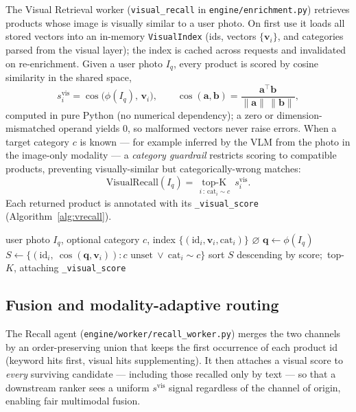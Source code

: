 The Visual Retrieval worker (\texttt{visual\_recall} in
\texttt{engine/enrichment.py}) retrieves products whose image is visually similar
to a user photo. On first use it loads all stored vectors into an in-memory
\texttt{VisualIndex} (ids, vectors $\{\mathbf{v}_i\}$, and categories parsed from
the visual layer); the index is cached across requests and invalidated on
re-enrichment. Given a user photo $I_q$, every product is scored by cosine
similarity in the shared space,
\begin{equation}
  s^{\mathrm{vis}}_i=\cos\!\big(\phi(I_q),\,\mathbf{v}_i\big),
  \qquad
  \cos(\mathbf{a},\mathbf{b})=\frac{\mathbf{a}^{\top}\mathbf{b}}{\lVert\mathbf{a}\rVert\,\lVert\mathbf{b}\rVert},
  \label{eq:svis}
\end{equation}
computed in pure Python (no numerical dependency); a zero or dimension-mismatched
operand yields $0$, so malformed vectors never raise errors. When a target
category $c$ is known --- for example inferred by the VLM from the photo in the
image-only modality --- a \emph{category guardrail} restricts scoring to
compatible products, preventing visually-similar but categorically-wrong matches:
\begin{equation}
  \mathrm{VisualRecall}(I_q)=\operatorname*{top\text{-}K}_{\,i\,:\,\mathrm{cat}_i\sim c}\ s^{\mathrm{vis}}_i .
  \label{eq:vrecall}
\end{equation}
Each returned product is annotated with its \texttt{\_visual\_score}
(Algorithm~\ref{alg:vrecall}).

\begin{algorithm}[t]
\caption{Online visual recall}
\label{alg:vrecall}
\begin{algorithmic}[1]
\Require user photo $I_q$, optional category $c$, index $\{(\text{id}_i,\mathbf{v}_i,\mathrm{cat}_i)\}$
 \Return $\varnothing$ \EndIf
\State $\mathbf{q}\gets\phi(I_q)$
\State $S \gets \{(\text{id}_i,\ \cos(\mathbf{q},\mathbf{v}_i)) : c\text{ unset}\ \lor\ \mathrm{cat}_i\sim c\}$
\State sort $S$ descending by score;\ \Return top-$K$, attaching \texttt{\_visual\_score}
\end{algorithmic}
\end{algorithm}

\subsection{Fusion and modality-adaptive routing}
\label{sec:fusion}

The Recall agent (\texttt{engine/worker/recall\_worker.py}) merges the two
channels by an order-preserving union that keeps the first occurrence of each
product id (keyword hits first, visual hits supplementing). It then attaches a
visual score to \emph{every} surviving candidate --- including those recalled
only by text --- so that a downstream ranker sees a uniform $s^{\mathrm{vis}}$
signal regardless of the channel of origin, enabling fair multimodal fusion.

